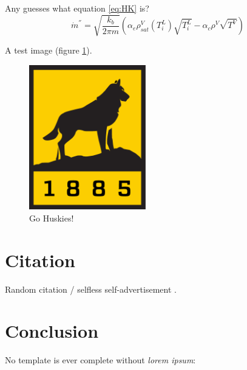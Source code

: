 \documentclass[preprint]{elsarticle}
\begin{document}
Any guesses what equation \ref{eq:HK} is?
\begin{equation} \label{eq:HK}
\dot{m}^{''}=\sqrt{\frac{k_b}{2 \pi m}}\left(\alpha_e\rho^V_{sat}(T^L_i)\sqrt{T_i^L}-\alpha_c\rho^V\sqrt{T^V}\right)
\end{equation}

A test image (figure \ref{f1}).
\begin{figure} [htb]
\centering
\includegraphics[width=2in]{university_logo}
\caption{Go Huskies! \label{f1}}
\end{figure}


\section{Citation}
Random citation / selfless self-advertisement \cite{bellur_2018a}.

\section{Conclusion}
No template is ever complete without \emph{lorem ipsum}:

\noindent \lipsum[1]



\end{document}
